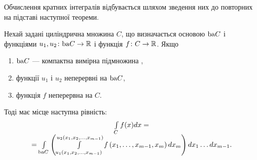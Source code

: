 Обчислення кратних інтегралів відбувається шляхом зведення них до повторних на підставі наступної теореми.
\begin{theorem}
Нехай задані циліндрична множина $C$, що визначається основою $\mathrm{ba} C$ і функціями ${u_1, u_2\colon \mathrm{ba} C\to \mathbb{R}}$ і функція $f\colon C\to \mathbb{R}$. Якщо
\begin{enumerate}
\item $\mathrm{ba} C$ --- компактна вимірна підмножина ,
\item функції $u_1$ і $u_2$ неперервні на $\mathrm{ba} C$,
\item функція $f$ неперервна на $C$.
\end{enumerate}
Тоді має місце наступна рівність:
\[
\begin{array}{c}
\int\limits_C f(x)d x = \\
 =\int\limits_{\mathrm{ba} C}\left( \int\limits_{u_1\left(x_1, x_2,\ldots, x_{m-1}\right)}^{u_2\left(x_1, x_2,\ldots, x_{m-1}\right)} f\left(x_1, \ldots, x_{m-1}, x_m \right)d x_m\right) d x_1 \ldots  d x_{m-1}.
\end{array}
\]
\end{theorem}

